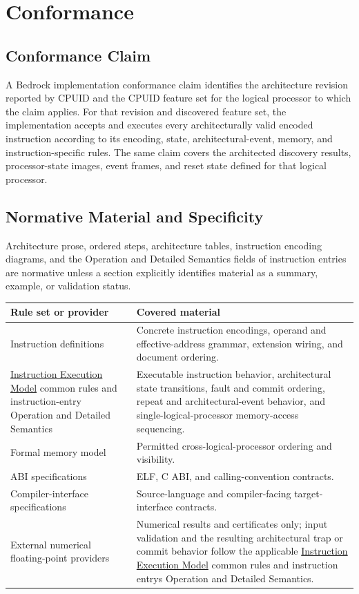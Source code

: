 \clearpage
\section{Conformance}\label{page:conformance}

\subsection{Conformance Claim}

A Bedrock implementation conformance claim identifies the architecture revision reported by CPUID and the CPUID
feature set for the logical processor to which the claim applies. For that revision and discovered feature set,
the implementation accepts and executes every architecturally valid encoded instruction according to its encoding,
state, architectural-event, memory, and instruction-specific rules. The same claim covers the architected discovery results,
processor-state images, event frames, and reset state defined for that logical processor.

\subsection{Normative Material and Specificity}

Architecture prose, ordered steps, architecture tables, instruction encoding diagrams, and the Operation
and Detailed Semantics fields of instruction entries are normative unless a section explicitly identifies material
as a summary, example, or validation status.

\noindent
\begin{tabularx}{\linewidth}{@{}>{\raggedright\arraybackslash}p{1.55in}X@{}}
\toprule
\textbf{Rule set or provider} & \textbf{Covered material}\\
\midrule
Instruction definitions & Concrete instruction encodings, operand and effective-address grammar, extension wiring,
and document ordering.\\
\hyperref[page:instruction-execution-model]{Instruction Execution Model} common rules and instruction-entry Operation
and Detailed Semantics & Executable instruction behavior, architectural state transitions, fault and commit ordering,
repeat and architectural-event behavior, and single-logical-processor memory-access sequencing.\\
Formal memory model & Permitted cross-logical-processor ordering and visibility.\\
ABI specifications & ELF, C ABI, and calling-convention contracts.\\
Compiler-interface specifications & Source-language and compiler-facing target-interface contracts.\\
External numerical floating-point providers & Numerical results and certificates only; input validation and the resulting
architectural trap or commit behavior follow the applicable
\hyperref[page:instruction-execution-model]{Instruction Execution Model} common rules and instruction entry\textquotesingle{}s Operation
and Detailed Semantics.\\
\bottomrule
\end{tabularx}

